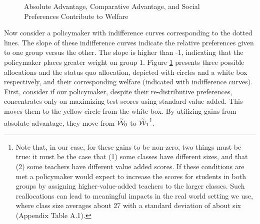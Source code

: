 \documentclass[12pt]{article}
\theoremstyle{definition}
\theoremstyle{definition}
\theoremstyle{definition}
\theoremstyle{definition}
\begin{document}
\begin{figure}[htpb]
\label{fig_theory_ppf}
    \centering
    \resizebox{!}{.46\textwidth}{
    \begin{tikzpicture}[scale=1]
	
    \end{tikzpicture}}
    \caption{Absolute Advantage, Comparative Advantage, and Social Preferences Contribute to Welfare}
    \label{fig:theory}
\end{figure}


Now consider a policymaker with indifference curves corresponding to the dotted lines. The slope of these indifference curves indicate the relative preferences given to one group versus the other. The slope is higher than -1, indicating that the policymaker places greater weight on group 1. Figure \ref{fig:theory} presents three possible allocations and the status quo allocation, depicted with circles and a white box respectively, and their corresponding welfare (indicated with indifference curves). First, consider if our policymaker, despite their re-distributive preferences, concentrates only on maximizing test scores using standard value added. This moves them to the yellow circle from the white box. By utilizing gains from absolute advantage, they move from $\accentset{\sim}{\mathcal{W}}_0$ to $\accentset{\sim}{\mathcal{W}}_1$\footnote{Note that, in our case, for these gains to be non-zero, two things must be true: it must be the case that (1) some classes have different sizes, and that (2) some teachers have different value added scores. If these conditions are met a policymaker would expect to increase the scores for students in both groups by assigning higher-value-added teachers to the larger classes. Such reallocations can lead to meaningful impacts in the real world setting we use, where class size averages about 27 with a standard deviation of about six (Appendix Table A.1).}.
\end{document}
